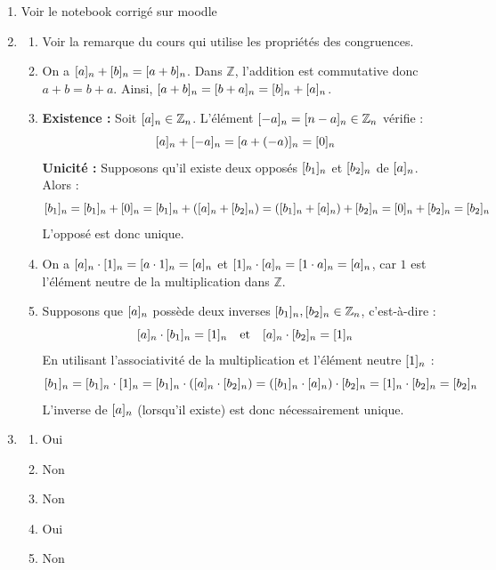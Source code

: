 \begin{enumerate}[label=\thechapter.\arabic*, font=\bfseries, itemsep=7mm,labelsep*=3mm,left=0mm]
\item Voir le notebook corrigé sur moodle

\item
\begin{enumerate}[label=\alph*),itemsep=5mm,left=-1mm,labelsep*=2mm]
	\item Voir la remarque du cours qui utilise les propriétés des congruences.
	
	\item On a $[a]_{n} + [b]_{n} = [a + b]_{n}$. Dans $\mathbb{Z}$, l'addition est commutative donc $a + b = b + a$. Ainsi, $[a+b]_{n} = [b+a]_{n} = [b]_{n} + [a]_{n}$.
	
	\item \textbf{Existence :} Soit $[a]_{n} \in \mathbb{Z}_n$. L'élément $[-a]_{n} = [n - a]_{n} \in \mathbb{Z}_n$ vérifie :
	\[
	[a]_{n} + [-a]_{n} = [a + (-a)]_{n} = [0]_{n}
	\]
	\textbf{Unicité :} Supposons qu'il existe deux opposés $[b_1]_{n}$ et $[b_2]_{n}$ de $[a]_{n}$. Alors :
	\[
	[b_1]_{n} = [b_1]_{n} + [0]_{n} = [b_1]_{n} + ([a]_{n} + [b_2]_{n}) = ([b_1]_{n} + [a]_{n}) + [b_2]_{n} = [0]_{n} + [b_2]_{n} = [b_2]_{n}
	\]
	L'opposé est donc unique.
	
	\item On a $[a]_{n} \cdot [1]_{n} = [a \cdot 1]_{n} = [a]_{n}$ et $[1]_{n} \cdot [a]_{n} = [1 \cdot a]_{n} = [a]_{n}$, car $1$ est l'élément neutre de la multiplication dans $\mathbb{Z}$.

	\item Supposons que $[a]_{n}$ possède deux inverses $[b_1]_{n}, [b_2]_{n} \in \mathbb{Z}_n$, c'est-à-dire :
	\[
	[a]_{n} \cdot [b_1]_{n} = [1]_{n} \quad \text{et} \quad [a]_{n} \cdot [b_2]_{n} = [1]_{n}
	\]
	En utilisant l'associativité de la multiplication et l'élément neutre $[1]_{n}$ :
	\[
	[b_1]_{n} = [b_1]_{n} \cdot [1]_{n} = [b_1]_{n} \cdot ([a]_{n} \cdot [b_2]_{n}) = ([b_1]_{n} \cdot [a]_{n}) \cdot [b_2]_{n} = [1]_{n} \cdot [b_2]_{n} = [b_2]_{n}
	\]
	L'inverse de $[a]_{n}$ (lorsqu'il existe) est donc nécessairement unique.
\end{enumerate}


\item
\begin{enumerate}[label=\alph*),itemsep=1mm,left=-1mm,labelsep*=2mm]
	\item Oui
	\item Non
	\item Non
	\item Oui
	\item Non
\end{enumerate}


\end{enumerate}
